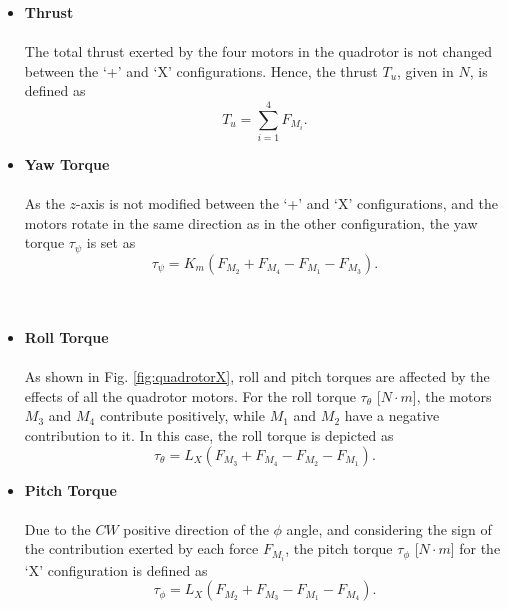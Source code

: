 \begin{itemize}
\item \textbf{Thrust}\\\\
The total thrust exerted by the four motors in the quadrotor is not changed between the `+' and `X' configurations. Hence, the thrust $T_u$, given in $N$, is defined as
\begin{equation}
\label{ec:ux}
T_u = \sum_{i=1}^{4}F_{M_i}.
\end{equation}

\item \textbf{Yaw Torque}\\\\
As the $z$-axis is not modified between the `+' and `X' configurations, and the motors rotate in the same direction as in the other configuration, the yaw torque $\tau_\psi$ is set as
\begin{equation}
\label{ec:taupsix}
\tau_{\psi} = K_{m}(F_{M_2} + F_{M_4} - F_{M_1} - F_{M_3}).
\end{equation}
\\\\
\item \textbf{Roll Torque}\\\\
As shown in Fig. \ref{fig:quadrotorX}, roll and pitch torques are affected by the effects of all the quadrotor motors. For the roll torque $\tau_{\theta}$ [$N\cdot m$], the motors $M_3$ and $M_4$ contribute positively, while $M_1$ and $M_2$ have a negative contribution to it. In this case, the roll torque is depicted as
\begin{equation}
\label{ec:tauthetax}
\tau_{\theta} = L_{X}(F_{M_3}+F_{M_4}-F_{M_2}-F_{M_1}).
\end{equation}

\item \textbf{Pitch Torque}\\\\
Due to the $CW$ positive direction of the $\phi$ angle, and considering the sign of the contribution exerted by each force $F_{M_i}$, the pitch torque $\tau_{\phi}$ [$N\cdot m$] for the `X' configuration is defined as
\begin{equation}
\label{ec:tauphix}
\tau_{\phi} = L_{X}(F_{M_2}+F_{M_3}-F_{M_1}-F_{M_4}).
\end{equation}

\end{itemize}

